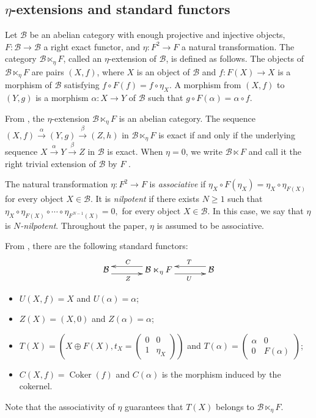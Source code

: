 \documentclass[11pt,reqno]{amsart}
\numberwithin{equation}{section}
\newcommand{\cB}{\mathcal B}
\newcommand{\Coker}{\operatorname{Coker}}
\begin{document}
\subsection{\texorpdfstring{$\eta$}{eta}-extensions and standard functors} Let $\cB$ be an abelian category with enough projective and injective objects, $F\colon\cB\to\cB$ a right exact functor, and $\eta\colon F^2\to F$ a natural transformation. The category $\cB\ltimes_\eta F$, called an $\eta$-extension of $\cB$, is defined as follows. The objects of $\cB\ltimes_\eta F$ are pairs $(X,f)$, where $X$ is an object of $\cB$ and $f\colon F(X)\to X$ is a morphism of $\cB$ satisfying
$f\circ F(f)=f\circ\eta_X.$
A morphism from $(X,f)$ to $(Y,g)$ is a morphism $\alpha\colon X\to Y$ of $\cB$ such that
$g\circ F(\alpha)=\alpha\circ f.$

From \cite{Marmaridis}, the $\eta$-extension $\cB\ltimes_\eta F$ is an abelian category. The sequence
$(X,f)\xrightarrow{\alpha} (Y,g)\xrightarrow{\beta} (Z,h)$ in $\cB\ltimes_\eta F$ is exact if and only if the underlying sequence
$X\xrightarrow{\alpha} Y\xrightarrow{\beta} Z$ in $\cB$ is exact. When $\eta=0$, we write $\cB\ltimes F$ and call it the right trivial extension of $\cB$ by $F$ \cite{FossumGriffithReiten}.

The natural transformation $\eta\colon F^2\to F$ is \emph{associative} if
$\eta_X\circ F(\eta_X)=\eta_X\circ\eta_{F(X)}$
for every object $X\in\cB$. It is \emph{nilpotent} if there exists $N\ge1$ such that
$\eta_X\circ\eta_{F(X)}\circ\cdots\circ\eta_{F^{N-1}(X)}=0,$
for every object $X\in\cB$. In this case, we say that $\eta$ is \emph{$N$-nilpotent}. Throughout the paper, $\eta$ is assumed to be associative.

From \cite{Beligiannis}, there are the following standard functors:
\[
\xymatrix@C=3pc{
\cB \ar@<-1ex>[r]_{Z\ \ \ } & \cB\ltimes_\eta F \ar@<-1ex>[l]_{C\ \ \ } \ar@<-1ex>[r]_{\ \ \ U}
& \cB \ar@<-1ex>[l]_{\ \ \ T}
}
\]
\begin{itemize}
 	\item $U(X,f)=X$ and $U(\alpha)=\alpha$;
 	\item $Z(X)=(X,0)$ and $Z(\alpha)=\alpha$;
 	\item $T(X)=\left(X\oplus F(X),t_X =\left(\begin{smallmatrix}
 		0&0\\
 		1&\eta_X
 	\end{smallmatrix}\right)\right)$ and $T(\alpha)=\begin{pmatrix}
 	\alpha&0\\
 	0& F(\alpha)
 	\end{pmatrix}$;
 	\item $C(X,f)=\Coker(f)$ and $C(\alpha)$ is the morphism induced by the cokernel.
\end{itemize}
Note that the associativity of $\eta$ guarantees that
$T(X)$ belongs to $\cB\ltimes_\eta F$.
\end{document}
